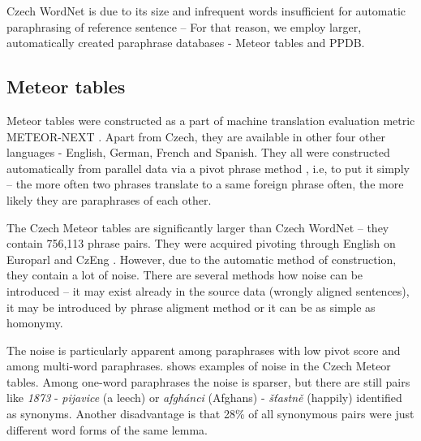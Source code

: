 Czech WordNet is due to its size and infrequent words insufficient for automatic paraphrasing of reference sentence --
For that reason, we employ larger, automatically created paraphrase databases - Meteor tables and PPDB.
 
\subsection{Meteor tables} %
\label{meteori}
Meteor tables were constructed as a part of machine translation evaluation metric METEOR-NEXT \citep{meteor-tables}. 
Apart from Czech, they are available in other four other languages - English, German, French and Spanish. 
They all were constructed automatically from parallel data via a pivot phrase method \citep{pivoting}, i.e, to put it simply --  
the more often two phrases translate to a same foreign phrase often, the more likely they are paraphrases of each other. 

The Czech Meteor tables are significantly larger than Czech WordNet -- they contain 756,113 phrase pairs. 
They were acquired pivoting through English on Europarl and CzEng \citep{czeng}. 
However, due to the automatic method of construction, they contain a lot of noise. 
There are several methods how noise can be introduced -- it may exist already in the source data (wrongly aligned sentences), it may be introduced by phrase aligment method or it can be as simple as homonymy. 


The noise is particularly apparent among paraphrases with low pivot score and among multi-word paraphrases.  shows examples of noise in the Czech Meteor tables. 
Among one-word paraphrases the noise is sparser, but there are still pairs like \textit{1873} - \textit{pijavice} (a leech) or \textit{afgh\'{a}nci} (Afghans) - \textit{š\v{t}astně} (happily) identified as synonyms. 
Another disadvantage is that 28\% of all synonymous pairs were just different word forms of the same lemma.

